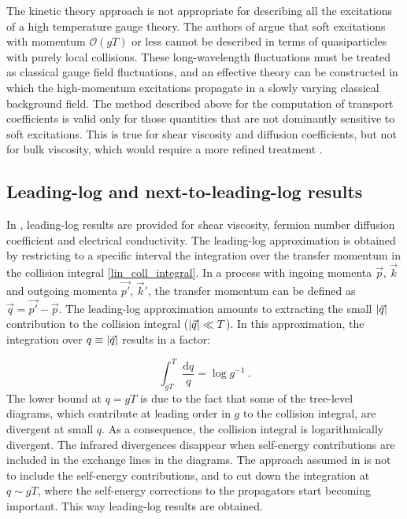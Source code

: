 The kinetic theory approach is not appropriate for describing all the excitations of a high temperature gauge theory. The authors of \cite{Arnold:2000dr,Arnold:2003zc} argue that soft excitations with momentum $\mathcal O(gT)$ or less cannot be described in terms of quasiparticles with purely local collisions. These long-wavelength fluctuations must be treated as classical gauge field fluctuations, and an effective theory can be constructed in which the high-momentum excitations propagate in a slowly varying classical background field. The method described above for the computation of transport coefficients is valid only for those quantities that are not dominantly sensitive to soft excitations. This is true for shear viscosity and diffusion coefficients, but not for bulk viscosity, which would require a more refined treatment \cite{Arnold:2000dr}.

 
\subsection{Leading-log and next-to-leading-log results}

In \cite{Arnold:2000dr}, leading-log results are provided for shear viscosity, fermion number diffusion coefficient and electrical conductivity. The leading-log approximation is obtained by restricting to a specific interval the integration over the transfer momentum in the collision integral \ref{lin_coll_integral}. In a process with ingoing momenta $\vec p$, $\vec k$ and outgoing momenta $\vec{p'}$, $\vec k'$, the transfer momentum can be defined as $\vec q = \vec{p'} - \vec p$. The leading-log approximation amounts to extracting the small $\abs{\vec q}$ contribution to the collision integral ($\abs{\vec q} \ll T$). In this approximation, the integration over $q \equiv \abs{\vec q}$ results in a factor:

\begin{equation}
\int_{gT}^T \frac{\mathrm d q}{q} = \log g^{-1} \: .
\end{equation}
%
The lower bound at $q = gT$ is due to the fact that some of the tree-level diagrams, which contribute at leading order in $g$ to the collision integral, are divergent at small $q$. As a consequence, the collision integral is logarithmically divergent. The infrared divergences disappear when self-energy contributions are included in the exchange lines in the diagrams. The approach assumed in \cite{Arnold:2000dr} is not to include the self-energy contributions, and to cut down the integration at $q \sim gT$, where the self-energy corrections to the propagators start becoming important. This way leading-log results are obtained.

